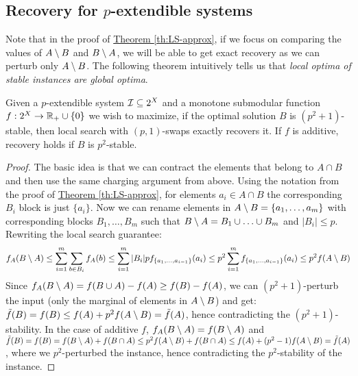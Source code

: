 \subsection{Recovery for $p$-extendible systems}
Note that in the proof of \hyperref[th:LS-approx]{Theorem \ref{th:LS-approx}}, if we focus on comparing the values of $A\setminus B$ and $B\setminus A$, we will be able to get exact recovery as we can perturb only $A\setminus B$. The following theorem intuitively tells us that \textit{local optima of stable instances are global optima}.
\begin{theorem} \label{th:LS-recovery}
Given a $p$-extendible system $\mathcal{I} \subseteq 2^X$ and a monotone submodular function $f:2^X \rightarrow \mathbb{R}_+\cup\{0\}$ we wish to maximize, if the optimal solution $B$ is $(p^2+1)$-stable, then local search with $(p,1)$-swaps exactly recovers it. If $f$ is additive, recovery holds if $B$ is $p^2$-stable.
\end{theorem}

\begin{proof}
The basic idea is that we can contract the elements that belong to $A\cap B$ and then use the same charging argument from above. Using the notation from the proof of \hyperref[th:LS-approx]{Theorem \ref{th:LS-approx}}, for elements $a_i\in A\cap B$ the corresponding $B_i$ block is just $\{a_i\}$. Now we can rename elements in $A\setminus B=\{a_1,\dots,a_m\}$ with corresponding blocks $B_1,\dots,B_m$ such that $B\setminus A = B_1 \cup \ldots \cup B_m$ and $|B_i| \leq p$. Rewriting the local search guarantee:
$$f_A(B\setminus A) \leq \sum_{i=1}^{m} \sum_{b \in B_i} f_A(b) \leq \sum_{i=1}^{m} |B_i| p f_{\{a_1,\ldots,a_{i-1}\}}(a_i)
\leq p^2 \sum_{i=1}^{m} f_{\{a_1,\ldots,a_{i-1}\}}(a_i) \leq p^2 f(A\setminus B)$$
Since $f_A(B\setminus A)=f(B\cup A)-f(A)\ge f(B)-f(A)$, we can $(p^2+1)$-perturb the input (only the marginal of elements in $A\setminus B$) and get: $\tilde{f}(B)=f(B) \le f(A)+p^2f(A\setminus B)=\tilde{f}(A)$, hence contradicting the $(p^2+1)$-stability.
In the case of additive $f$, $f_A(B\setminus A)= f(B\setminus A)$ and $\tilde{f}(B)=f(B)=f(B\setminus A)+f(B\cap A)\le p^2f(A\setminus B) +f(B\cap A)\le f(A)+(p^2-1)f(A\setminus B)=\tilde{f}(A)$, where we $p^2$-perturbed the instance, hence contradicting the $p^2$-stability of the instance.
\end{proof}



